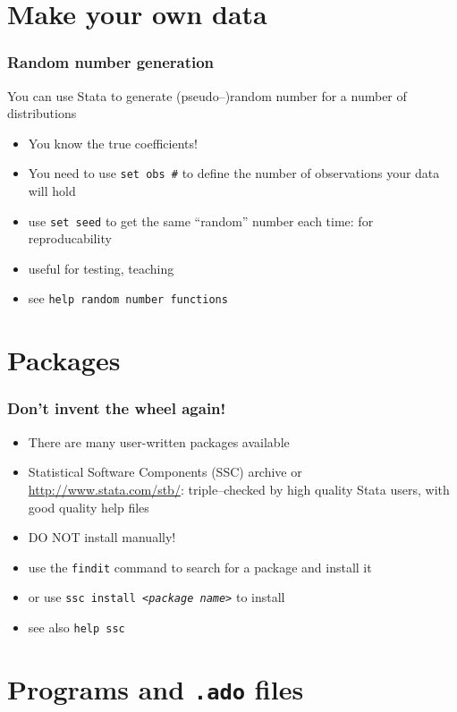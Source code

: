 \documentclass[pdftex, compress]{beamer}
\begin{document}
\section{Make your own data}

\begin{frame}
\frametitle{Random number generation}
You can use Stata to generate (pseudo--)random number for a number of distributions
	\begin{itemize}
		\item You know the \alert{true} coefficients!
		\item You need to use \texttt{set obs \#} to define the number of observations your data will hold
		\item use \texttt{set seed} to get the same ``random'' number each time: for reproducability
		\item useful for testing, teaching
		\item see \texttt{help random number functions}
	\end{itemize}
\end{frame}

\section{Packages}

\begin{frame}
\frametitle{Don't invent the wheel again!}
	\begin{itemize}
		\item There are many user-written packages available
		\item Statistical Software Components (SSC) archive or \url{http://www.stata.com/stb/}: triple--checked by high quality Stata users, with good quality help files
		\item \alert{DO NOT install manually!}
		\item use the \texttt{findit} command to search for a package and install it
		\item or use \texttt{ssc install <\textsl{package name}>} to install
		\item see also \texttt{help ssc}
	\end{itemize}
\end{frame}

\section{Programs and \texttt{.ado} files}
\end{document}
